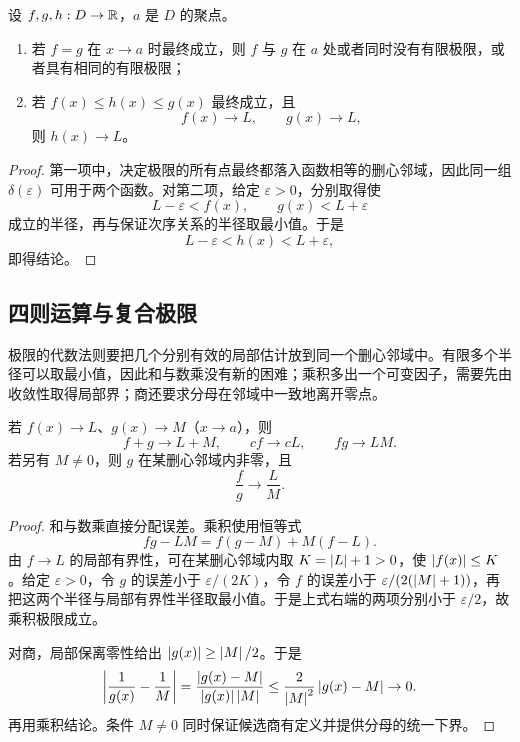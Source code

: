 \begin{proposition}[局部性与夹逼]
设 \(f,g,h:D\to\mathbb{R}\)，\(a\) 是 \(D\) 的聚点。
\begin{enumerate}
 \item 若 \(f=g\) 在 \(x\to a\) 时最终成立，则 \(f\) 与 \(g\) 在 \(a\) 处或者同时没有有限极限，或者具有相同的有限极限；
 \item 若 \(f(x)\le h(x)\le g(x)\) 最终成立，且
 \[
  f(x)\to L,\qquad g(x)\to L,
 \]
 则 \(h(x)\to L\)。
\end{enumerate}
\end{proposition}

\begin{proof}
第一项中，决定极限的所有点最终都落入函数相等的删心邻域，因此同一组 \(\delta(\varepsilon)\) 可用于两个函数。对第二项，给定 \(\varepsilon>0\)，分别取得使
\[
 L-\varepsilon<f(x),\qquad g(x)<L+\varepsilon
\]
成立的半径，再与保证次序关系的半径取最小值。于是
\[
 L-\varepsilon<h(x)<L+\varepsilon,
\]
即得结论。
\end{proof}

\subsection{四则运算与复合极限}

极限的代数法则要把几个分别有效的局部估计放到同一个删心邻域中。有限多个半径可以取最小值，因此和与数乘没有新的困难；乘积多出一个可变因子，需要先由收敛性取得局部界；商还要求分母在邻域中一致地离开零点。

\begin{theorem}[代数运算]
若 \(f(x)\to L\)、\(g(x)\to M\)（\(x\to a\)），则
\[
 f+g\to L+M,\qquad cf\to cL,\qquad fg\to LM.
\]
若另有 \(M\ne0\)，则 \(g\) 在某删心邻域内非零，且
\[
 \frac{f}{g}\longrightarrow\frac LM.
\]
\end{theorem}

\begin{proof}
和与数乘直接分配误差。乘积使用恒等式
\[
 fg-LM=f(g-M)+M(f-L).
\]
由 \(f\to L\) 的局部有界性，可在某删心邻域内取 \(K=\left|L\right|+1>0\)，使 \(\left|f(x)\right|\le K\)。给定 \(\varepsilon>0\)，令 \(g\) 的误差小于 \(\varepsilon/(2K)\)，令 \(f\) 的误差小于 \(\varepsilon/(2(\left|M\right|+1))\)，再把这两个半径与局部有界性半径取最小值。于是上式右端的两项分别小于 \(\varepsilon/2\)，故乘积极限成立。

对商，局部保离零性给出 \(\left|g(x)\right|\ge\left|M\right|/2\)。于是
\[
 \left|\frac1{g(x)}-\frac1M\right|
 =\frac{\left|g(x)-M\right|}{\left|g(x)\right|\left|M\right|}
 \le\frac{2}{\left|M\right|^2}\left|g(x)-M\right|\to0.
\]
再用乘积结论。条件 \(M\ne0\) 同时保证候选商有定义并提供分母的统一下界。
\end{proof}

